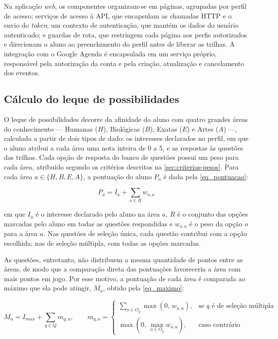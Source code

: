 Na aplicação \textit{web}, os componentes organizam-se em páginas, agrupadas por perfil de acesso; serviços de acesso à API, que encapsulam as chamadas HTTP e o envio do \textit{token}; um contexto de autenticação, que mantém os dados do usuário autenticado; e guardas de rota, que restringem cada página aos perfis autorizados e direcionam o aluno ao preenchimento do perfil antes de liberar as trilhas. A integração com o Google Agenda é encapsulada em um serviço próprio, responsável pela autorização da conta e pela criação, atualização e cancelamento dos eventos.

\subsection{Cálculo do leque de possibilidades}

O leque de possibilidades decorre da afinidade do aluno com quatro grandes áreas do conhecimento --- Humanas ($H$), Biológicas ($B$), Exatas ($E$) e Artes ($A$) ---, calculada a partir de dois tipos de dado: os interesses declarados no perfil, em que o aluno atribui a cada área uma nota inteira de 0 a 5, e as respostas às questões das trilhas. Cada opção de resposta do banco de questões possui um peso para cada área, atribuído segundo os critérios descritos na \autoref{sec:criterios-pesos}. Para cada área $a \in \{H, B, E, A\}$, a pontuação do aluno $P_a$ é dada pela \autoref{eq_pontuacao}:

\begin{equation}
P_a = I_a + \sum_{o \in R} w_{o,a}
\label{eq_pontuacao}
\end{equation}

\noindent em que $I_a$ é o interesse declarado pelo aluno na área $a$, $R$ é o conjunto das opções marcadas pelo aluno em todas as questões respondidas e $w_{o,a}$ é o peso da opção $o$ para a área $a$. Nas questões de seleção única, cada questão contribui com a opção escolhida; nas de seleção múltipla, com todas as opções marcadas.

As questões, entretanto, não distribuem a mesma quantidade de pontos entre as áreas, de modo que a comparação direta das pontuações favoreceria a área com mais pontos em jogo. Por esse motivo, a pontuação de cada área é comparada ao máximo que ela pode atingir, $M_a$, obtido pela \autoref{eq_maximo}:

\begin{equation}
M_a = I_{max} + \sum_{q \in Q} m_{q,a},
\qquad
m_{q,a} =
\begin{cases}
\displaystyle\sum_{o \in O_q} \max\left(0,\, w_{o,a}\right), & \text{se } q \text{ é de seleção múltipla}\\[2ex]
\max\left(0,\, \displaystyle\max_{o \in O_q} w_{o,a}\right), & \text{caso contrário}
\end{cases}
\label{eq_maximo}
\end{equation}

